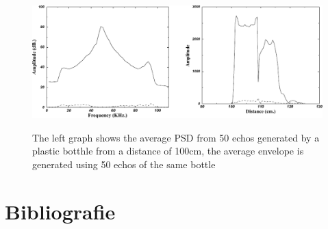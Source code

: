 \documentclass[10pt,a4paper]{article}
\begin{document}
\begin{figure}[h]

  \centering
      \includegraphics[width=1\textwidth]{ultrafreq.pdf}
  \caption{The left graph shows the average PSD from 50 echos generated by a plastic botthle from a distance of 100cm, the average envelope is generated using 50 echos of the same bottle} \cite{ultraobject}  \label{ultrafreq}
 
\end{figure}


\newpage

\section{Bibliografie}


\end{document}

